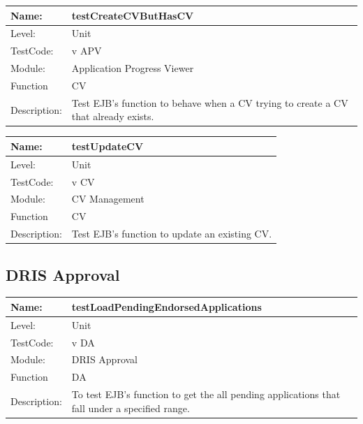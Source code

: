 \documentclass[12pt]{article}
\begin{document}
\begin{center}
\begin{tabular}{|l|p{12cm}|}
\hline

 Name: & testCreateCVButHasCV  \\
\hline
Level: & Unit \\
\hline
TestCode: & v APV \\
\hline
Module:& Application Progress Viewer \\
\hline
Function & CV \\
\hline
Description: & Test EJB's function to behave when a CV trying to create a CV that already exists. \\
\hline
\end{tabular}
\end{center}

\begin{center}
\begin{tabular}{|l|p{12cm}|}
\hline

 Name: & testUpdateCV  \\
\hline
Level: & Unit \\
\hline
TestCode: & v CV \\
\hline
Module:& CV Management \\
\hline
Function & CV \\
\hline
Description: & Test EJB's function to update an existing CV. \\
\hline
\end{tabular}
\end{center}


\subsection{DRIS Approval}

\begin{center}
\begin{tabular}{|l|p{12cm}|}
\hline
 Name: & testLoadPendingEndorsedApplications  \\
\hline
Level: & Unit \\
\hline
TestCode: & v DA \\
\hline
Module:& DRIS Approval \\
\hline
Function & DA \\
\hline
Description: & To test EJB's function to get the all pending applications that fall under a specified range. \\
\hline
\end{tabular}
\end{center}
\end{document}
